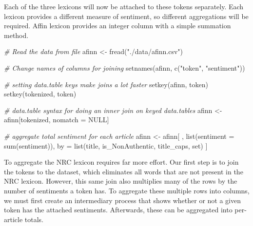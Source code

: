 \documentclass[
]{article}
\newenvironment{Shaded}{\begin{snugshade}}{\end{snugshade}}
\newcommand{\AttributeTok}[1]{\textcolor[rgb]{0.77,0.63,0.00}{#1}}
\newcommand{\CommentTok}[1]{\textcolor[rgb]{0.56,0.35,0.01}{\textit{#1}}}
\newcommand{\ConstantTok}[1]{\textcolor[rgb]{0.00,0.00,0.00}{#1}}
\newcommand{\FunctionTok}[1]{\textcolor[rgb]{0.00,0.00,0.00}{#1}}
\newcommand{\NormalTok}[1]{#1}
\newcommand{\OtherTok}[1]{\textcolor[rgb]{0.56,0.35,0.01}{#1}}
\newcommand{\StringTok}[1]{\textcolor[rgb]{0.31,0.60,0.02}{#1}}
\begin{document}
Each of the three lexicons will now be attached to these tokens
separately. Each lexicon provides a different measure of sentiment, so
different aggregations will be required. Affin lexicon provides an
integer column with a simple summation method.

\begin{Shaded}
\begin{Highlighting}[]
\CommentTok{\# Read the data from file}
\NormalTok{afinn }\OtherTok{\textless{}{-}} \FunctionTok{fread}\NormalTok{(}\StringTok{"./data/afinn.csv"}\NormalTok{)}

\CommentTok{\# Change names of columns for joining}
\FunctionTok{setnames}\NormalTok{(afinn, }\FunctionTok{c}\NormalTok{(}\StringTok{"token"}\NormalTok{, }\StringTok{"sentiment"}\NormalTok{))}

\CommentTok{\# setting data.table keys make joins a lot faster}
\FunctionTok{setkey}\NormalTok{(afinn, token)}
\FunctionTok{setkey}\NormalTok{(tokenized, token)}

\CommentTok{\# data.table syntax for doing an inner join on keyed data.tables}
\NormalTok{afinn }\OtherTok{\textless{}{-}}\NormalTok{ afinn[tokenized, nomatch }\OtherTok{=} \ConstantTok{NULL}\NormalTok{]}

\CommentTok{\# aggregate total sentiment for each article}
\NormalTok{afinn }\OtherTok{\textless{}{-}}\NormalTok{ afinn[}
\NormalTok{  ,}
  \FunctionTok{list}\NormalTok{(}\AttributeTok{sentiment =} \FunctionTok{sum}\NormalTok{(sentiment)),}
\NormalTok{  by  }\OtherTok{=} \FunctionTok{list}\NormalTok{(title, is\_NonAuthentic, title\_caps, set)}
\NormalTok{]}
\end{Highlighting}
\end{Shaded}

To aggregate the NRC lexicon requires far more effort. Our first step is
to join the tokens to the dataset, which eliminates all words that are
not present in the NRC lexicon. However, this same join also multiplies
many of the rows by the number of sentiments a token has. To aggregate
these multiple rows into columns, we must first create an intermediary
process that shows whether or not a given token has the attached
sentiments. Afterwards, these can be aggregated into per-article totals.
\end{document}

